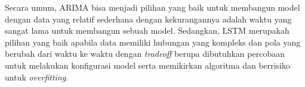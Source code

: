 Secara umum, ARIMA bisa menjadi pilihan yang baik untuk membangun model dengan data yang relatif sederhana dengan kekurangannya adalah waktu yang sangat lama untuk membangun sebuah model. Sedangkan, LSTM merupakah pilihan yang baik apabila data memiliki hubungan yang kompleks dan pola yang berubah dari waktu ke waktu dengan \textit{tradeoff} berupa dibutuhkan percobaan untuk melakukan konfigurasi model serta memikirkan algoritma dan berrisiko untuk \textit{overfitting}.